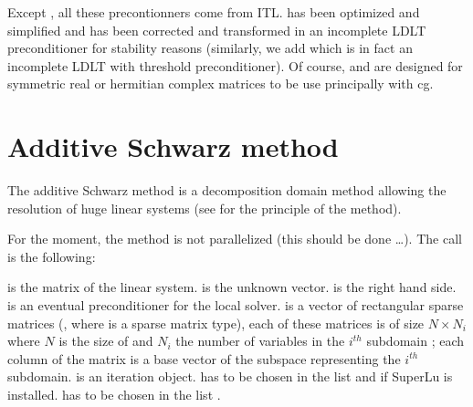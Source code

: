 \documentclass[a4paper,11pt,english]{sphinxmanual}
\begin{document}
\sphinxAtStartPar
Except , all these precontionners come from ITL.  has been optimized and simplified and  has been corrected and transformed in an incomplete LDLT preconditioner for stability reasons (similarly, we add  which is in fact an incomplete LDLT with threshold preconditioner). Of course,  and  are designed for symmetric real or hermitian complex matrices to be use principally with cg.


\section{Additive Schwarz method}
\label{\detokenize{gmm/iter:additive-schwarz-method}}
\sphinxAtStartPar
The additive Schwarz method is a decomposition domain method allowing the resolution of huge linear systems (see  for the principle of the method).

\sphinxAtStartPar
For the moment, the method is not parallelized (this should be done …). The call is the following:

\begin{sphinxVerbatim}[commandchars=\\\{\}]
       
\end{sphinxVerbatim}

\sphinxAtStartPar
{} is the matrix of the linear system.  is the unknown vector.  is the right hand side.  is an eventual preconditioner for the local solver.  is a vector of rectangular sparse matrices (, where  is a sparse matrix type), each of these matrices is of size \(N \times N_i\) where \(N\) is the size of  and \(N_i\) the number of variables in the \(i^{th}\) sub\sphinxhyphen{}domain ; each column of the matrix is a base vector of the sub\sphinxhyphen{}space representing the \(i^{th}\) sub\sphinxhyphen{}domain.  is an iteration object.  has to be chosen in the list  and   if SuperLu is installed.  has to be chosen in the list .
\end{document}
